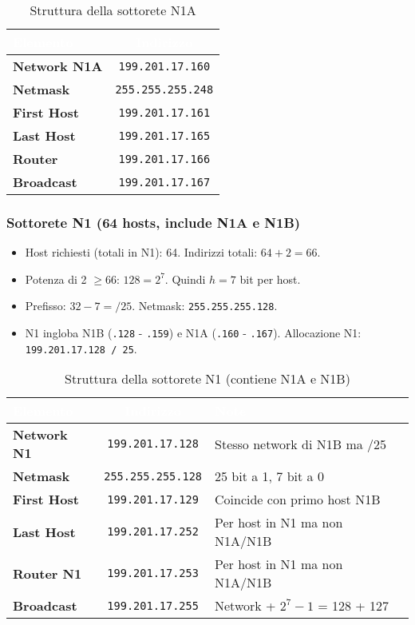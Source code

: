 \begin{table}[h]
\centering
\begin{tabular}{|l|c|}
\hline
\rowcolor{bg_custom}
\textcolor{white}{\textbf{Elemento}} & \textcolor{white}{\textbf{Indirizzo}} \\
\hline
\textbf{Network N1A} & \texttt{199.201.17.160} \\
\hline
\textbf{Netmask} & \texttt{255.255.255.248} \\
\hline
\textbf{First Host} & \texttt{199.201.17.161} \\
\hline
\textbf{Last Host} & \texttt{199.201.17.165} \\
\hline
\textbf{Router} & \texttt{199.201.17.166} \\
\hline
\textbf{Broadcast} & \texttt{199.201.17.167} \\
\hline
\end{tabular}
\caption{Struttura della sottorete N1A}
\end{table}

\subsubsection{Sottorete N1 (64 hosts, include N1A e N1B)}
\begin{itemize}
    \item Host richiesti (totali in N1): 64. Indirizzi totali: $64 + 2 = 66$.
    \item Potenza di 2 $\geq 66$: $128 = 2^7$. Quindi $h=7$ bit per host.
    \item Prefisso: $32 - 7 = /25$. Netmask: \texttt{255.255.255.128}.
    \item N1 ingloba N1B (\texttt{.128} - \texttt{.159}) e N1A (\texttt{.160} - \texttt{.167}). Allocazione N1: \texttt{199.201.17.128 / 25}.
\end{itemize}

\begin{table}[h]
\centering
\begin{tabular}{|l|c|l|}
\hline
\rowcolor{bg_custom}
\textcolor{white}{\textbf{Elemento}} & \textcolor{white}{\textbf{Indirizzo}} & \textcolor{white}{\textbf{Note}} \\
\hline
\textbf{Network N1} & \texttt{199.201.17.128} & Stesso network di N1B ma /25 \\
\hline
\textbf{Netmask} & \texttt{255.255.255.128} & 25 bit a 1, 7 bit a 0 \\
\hline
\textbf{First Host} & \texttt{199.201.17.129} & Coincide con primo host N1B \\
\hline
\textbf{Last Host} & \texttt{199.201.17.252} & Per host in N1 ma non N1A/N1B \\
\hline
\textbf{Router N1} & \texttt{199.201.17.253} & Per host in N1 ma non N1A/N1B \\
\hline
\textbf{Broadcast} & \texttt{199.201.17.255} & Network + $2^7 - 1$ = 128 + 127 \\
\hline
\end{tabular}
\caption{Struttura della sottorete N1 (contiene N1A e N1B)}
\end{table}

